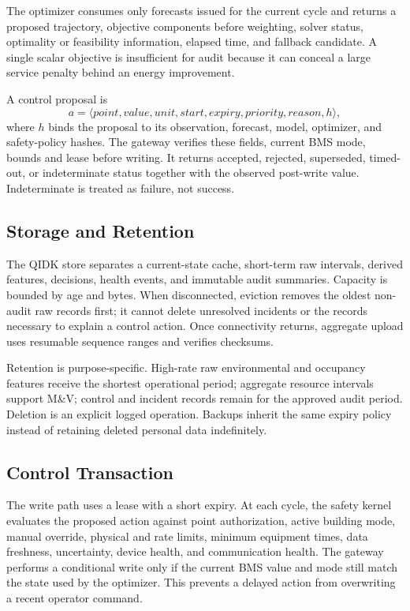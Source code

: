 The optimizer consumes only forecasts issued for the current cycle and returns a proposed trajectory, objective components before weighting, solver status, optimality or feasibility information, elapsed time, and fallback candidate. A single scalar objective is insufficient for audit because it can conceal a large service penalty behind an energy improvement.

A control proposal is
\begin{equation}
	a=\langle point,value,unit,start,expiry,priority,reason,h\rangle,
\end{equation}
where $h$ binds the proposal to its observation, forecast, model, optimizer, and safety-policy hashes. The gateway verifies these fields, current BMS mode, bounds and lease before writing. It returns accepted, rejected, superseded, timed-out, or indeterminate status together with the observed post-write value. Indeterminate is treated as failure, not success.

\subsection{Storage and Retention}

The QIDK store separates a current-state cache, short-term raw intervals, derived features, decisions, health events, and immutable audit summaries. Capacity is bounded by age and bytes. When disconnected, eviction removes the oldest non-audit raw records first; it cannot delete unresolved incidents or the records necessary to explain a control action. Once connectivity returns, aggregate upload uses resumable sequence ranges and verifies checksums.

Retention is purpose-specific. High-rate raw environmental and occupancy features receive the shortest operational period; aggregate resource intervals support M\&V; control and incident records remain for the approved audit period. Deletion is an explicit logged operation. Backups inherit the same expiry policy instead of retaining deleted personal data indefinitely.

\subsection{Control Transaction}

The write path uses a lease with a short expiry. At each cycle, the safety kernel evaluates the proposed action against point authorization, active building mode, manual override, physical and rate limits, minimum equipment times, data freshness, uncertainty, device health, and communication health. The gateway performs a conditional write only if the current BMS value and mode still match the state used by the optimizer. This prevents a delayed action from overwriting a recent operator command.

